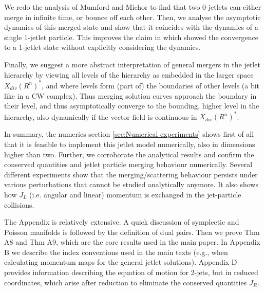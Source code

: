 \documentclass[12pt]{amsart}
\begin{document}
We redo the analysis of Mumford and Michor to find that two 0-jetlets
can either merge in infinite time, or bounce off each other.
Then, we analyse the asymptotic dynamics of this merged state and show
that it coincides with the dynamics of a single 1-jetlet particle. This
improves the claim in \cite{CotterHolmJacobsMeier2014} which showed the
convergence to a 1-jetlet state without explicitly considering the dynamics.

Finally, we suggest a more abstract interpretation of general mergers in
the jetlet hierarchy by viewing all levels of the hierarchy as embedded
in the larger space $X_{div}(R^n)^*$, and where levels form (part of) the
boundaries of other levels (a bit like in a CW complex).
Thus merging solution curves approach the boundary in their level, and
thus asymptotically converge to the bounding, higher level in the
hierarchy, also dynamically if the vector field is continuous in
$X_{div}(R^n)^*$.

In summary, the numerics section \ref{sec:Numerical experiments} shows first of all that it is feasible to implement this jetlet model numerically, also in dimensions higher than
two. Further, we corroborate the analytical results and confirm the
conserved quantities and jetlet particle merging behaviour numerically.
Several different experiments show that the merging/scattering behaviour persists
under various perturbations that cannot be studied analytically anymore.
It also shows how $J_L$ (i.e. angular and linear) momentum is exchanged
in the jet-particle collisions.



The Appendix is relatively extensive. A quick discussion of symplectic and Poisson manifolds is followed by the definition of dual pairs. Then we prove Thm A8 and Thm A9, which are the core results used in the main paper. In Appendix B we describe the index conventions used in the main texts (e.g., when calculating momentum maps for the general jetlet solutions). Appendix D provides information describing the equation of motion for 2-jets, but in reduced coordinates, which arise after reduction to eliminate the conserved quantities $J_R$.
\end{document}

